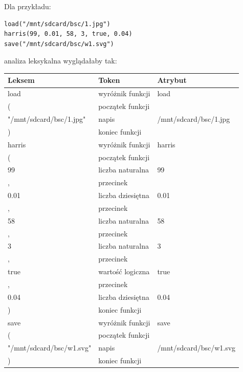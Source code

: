 \documentclass[11pt,a4paper]{article}
\begin{document}
Dla przykładu:
\begin{verbatim}
load("/mnt/sdcard/bsc/1.jpg")
harris(99, 0.01, 58, 3, true, 0.04)
save("/mnt/sdcard/bsc/w1.svg")
\end{verbatim}
analiza leksykalna wyglądałaby tak:
\begin{center}
\begin{tabular}{ | l | l | l | }
\hline                        
\bf{Leksem} & \bf{Token} & \bf{Atrybut} \\ \hline        
load & wyróżnik funkcji & load\\ \hline
(& początek funkcji & \\ \hline    
"/mnt/sdcard/bsc/1.jpg" & napis & /mnt/sdcard/bsc/1.jpg\\ \hline   
) & koniec funkcji &\\ \hline   
harris & wyróżnik funkcji & harris\\ \hline
(& początek funkcji & \\ \hline  
99 & liczba naturalna &99\\ \hline   
, & przecinek &\\ \hline   
0.01 & liczba dziesiętna &0.01\\ \hline   
, & przecinek &\\ \hline    
58 & liczba naturalna &58\\ \hline   
, & przecinek &\\ \hline   
3 & liczba naturalna &3\\ \hline   
, & przecinek &\\ \hline   
true & wartość logiczna & true\\ \hline   
, & przecinek &\\ \hline   
0.04 & liczba dziesiętna &0.04\\ \hline   
) & koniec funkcji &\\ \hline   
save & wyróżnik funkcji & save\\ \hline
( & początek funkcji & \\ \hline
"/mnt/sdcard/bsc/w1.svg" & napis & /mnt/sdcard/bsc/w1.svg\\ \hline   
) & koniec funkcji &\\ \hline   
\end{tabular}
\end{center}
\end{document}
